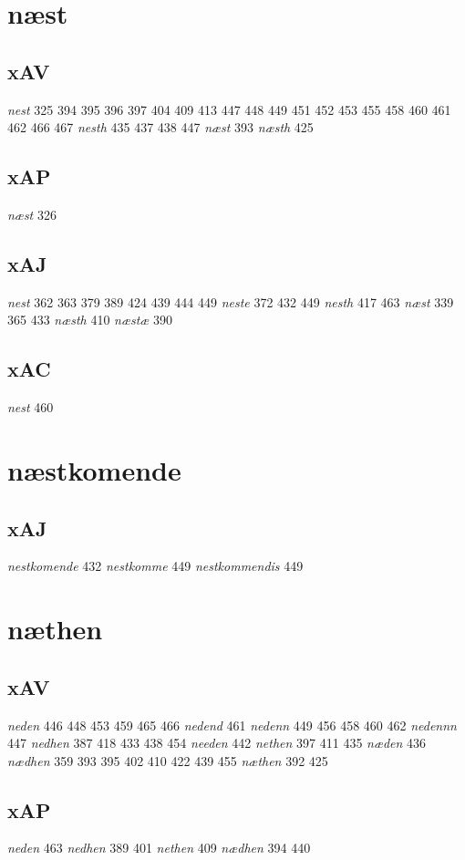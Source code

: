 \documentclass[a4paper,twocolumn]{article}
\begin{document}
\section{næst}
\label{sec:org772956b}
\subsection{xAV}
\label{sec:orgc57c365}
\emph{nest} 325 394 395 396 397 404 409 413 447 448 449 451 452 453 455 458 460 461 462 466 467 \emph{nesth} 435 437 438 447 \emph{næst} 393 \emph{næsth} 425 
\subsection{xAP}
\label{sec:org370868b}
\emph{næst} 326 
\subsection{xAJ}
\label{sec:orgbd22c41}
\emph{nest} 362 363 379 389 424 439 444 449 \emph{neste} 372 432 449 \emph{nesth} 417 463 \emph{næst} 339 365 433 \emph{næsth} 410 \emph{næstæ} 390 
\subsection{xAC}
\label{sec:orgba776d4}
\emph{nest} 460 
\section{næstkomende}
\label{sec:org8ad99a3}
\subsection{xAJ}
\label{sec:org8a8cc32}
\emph{nestkomende} 432 \emph{nestkomme} 449 \emph{nestkommendis} 449 
\section{næthen}
\label{sec:org9a58adc}
\subsection{xAV}
\label{sec:orgb3b3157}
\emph{neden} 446 448 453 459 465 466 \emph{nedend} 461 \emph{nedenn} 449 456 458 460 462 \emph{nedennn} 447 \emph{nedhen} 387 418 433 438 454 \emph{needen} 442 \emph{nethen} 397 411 435 \emph{næden} 436 \emph{nædhen} 359 393 395 402 410 422 439 455 \emph{næthen} 392 425 
\subsection{xAP}
\label{sec:org70e4b8b}
\emph{neden} 463 \emph{nedhen} 389 401 \emph{nethen} 409 \emph{nædhen} 394 440 
\end{document}
